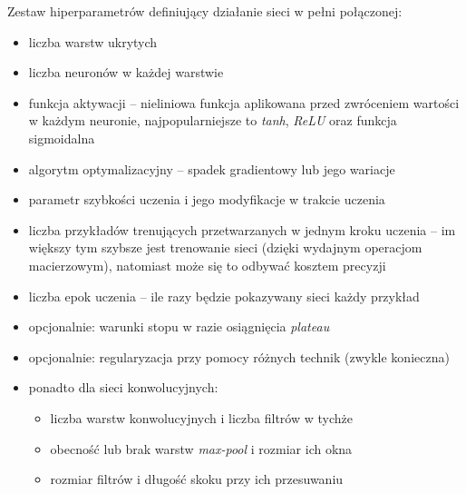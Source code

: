 Zestaw hiperparametrów definiujący działanie sieci w pełni połączonej: 
\begin{itemize}
	\item liczba warstw ukrytych 
	\item liczba neuronów w każdej warstwie
	\item funkcja aktywacji -- nieliniowa funkcja aplikowana przed zwróceniem wartości w każdym neuronie, najpopularniejsze to \textit{tanh}, \textit{ReLU} oraz funkcja sigmoidalna
	\item algorytm optymalizacyjny -- spadek gradientowy lub jego wariacje
	\item parametr szybkości uczenia i jego modyfikacje w trakcie uczenia
	\item liczba przykładów trenujących przetwarzanych w jednym kroku uczenia  -- im większy tym szybsze jest trenowanie sieci (dzięki wydajnym operacjom macierzowym), natomiast może się to odbywać kosztem precyzji
	\item liczba epok uczenia -- ile razy będzie pokazywany sieci każdy przykład
	\item opcjonalnie: warunki stopu  w razie osiągnięcia \textit{plateau}
	\item opcjonalnie: regularyzacja przy pomocy różnych technik (zwykle konieczna)
	\item ponadto dla sieci konwolucyjnych: 
	\begin{itemize}
		\item liczba warstw konwolucyjnych i liczba filtrów w tychże
		\item obecność lub brak warstw \textit{max-pool} i rozmiar ich okna
		\item rozmiar filtrów i długość skoku przy ich przesuwaniu
	\end{itemize}
\end{itemize}

